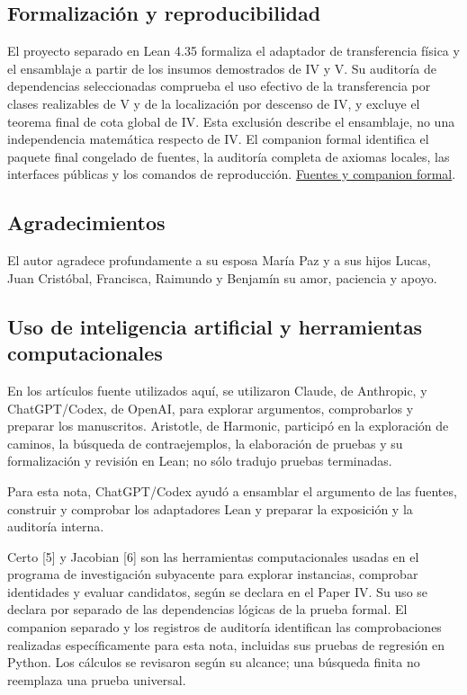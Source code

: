 \documentclass[spanish,11pt,a4paper]{article}
\begin{document}
\subsection{Formalización y
reproducibilidad}\label{formalizaciuxf3n-y-reproducibilidad}

El proyecto separado en Lean 4.35 formaliza el adaptador de
transferencia física y el ensamblaje a partir de los insumos demostrados
de IV y V. Su auditoría de dependencias seleccionadas comprueba el uso
efectivo de la transferencia por clases realizables de V y de la
localización por descenso de IV, y excluye el teorema final de cota
global de IV. Esta exclusión describe el ensamblaje, no una
independencia matemática respecto de IV. El companion formal identifica
el paquete final congelado de fuentes, la auditoría completa de axiomas
locales, las interfaces públicas y los comandos de reproducción.
\href{https://github.com/jtraverso/erdos-81-chordal-clique-partitions/tree/main/series_notes/NOTE_I_ERDOS81_TRANSFER/05_formalization}{Fuentes
y companion formal}.

\subsection{Agradecimientos}\label{agradecimientos}

El autor agradece profundamente a su esposa María Paz y a sus hijos
Lucas, Juan Cristóbal, Francisca, Raimundo y Benjamín su amor, paciencia
y apoyo.

\subsection{Uso de inteligencia artificial y herramientas
computacionales}\label{uso-de-inteligencia-artificial-y-herramientas-computacionales}

En los artículos fuente utilizados aquí, se utilizaron Claude, de
Anthropic, y ChatGPT/Codex, de OpenAI, para explorar argumentos,
comprobarlos y preparar los manuscritos. Aristotle, de Harmonic,
participó en la exploración de caminos, la búsqueda de contraejemplos,
la elaboración de pruebas y su formalización y revisión en Lean; no sólo
tradujo pruebas terminadas.

Para esta nota, ChatGPT/Codex ayudó a ensamblar el argumento de las
fuentes, construir y comprobar los adaptadores Lean y preparar la
exposición y la auditoría interna.

Certo {[}5{]} y Jacobian {[}6{]} son las herramientas computacionales
usadas en el programa de investigación subyacente para explorar
instancias, comprobar identidades y evaluar candidatos, según se declara
en el Paper IV. Su uso se declara por separado de las dependencias
lógicas de la prueba formal. El companion separado y los registros de
auditoría identifican las comprobaciones realizadas específicamente para
esta nota, incluidas sus pruebas de regresión en Python. Los cálculos se
revisaron según su alcance; una búsqueda finita no reemplaza una prueba
universal.
\end{document}
